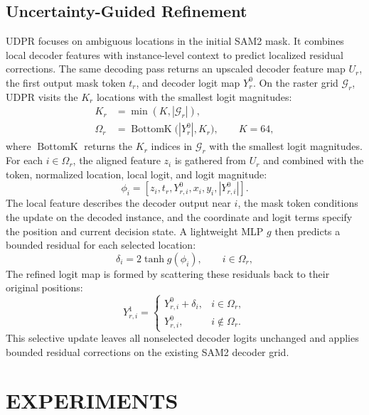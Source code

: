 \documentclass{article}
\begin{document}
\subsection{Uncertainty-Guided Refinement}
UDPR focuses on ambiguous locations in the initial SAM2 mask. It combines local decoder
features with instance-level context to predict localized residual corrections.
The same decoding pass returns an upscaled decoder feature map $U_r$, the
first output mask token $t_r$, and decoder logit map $Y_r^0$.
On the raster grid $\mathcal{G}_r$, UDPR visits the $K_r$ locations with
the smallest logit magnitudes:
\begin{equation}
\begin{aligned}
K_r&=\min(K,|\mathcal{G}_r|),\\
\Omega_r&=\operatorname{BottomK}\bigl(|Y_r^0|,K_r\bigr),\qquad K=64,
\end{aligned}
\label{eq:udpr-selection}
\end{equation}
\indent where $\operatorname{BottomK}$ returns the $K_r$ indices in $\mathcal{G}_r$
with the smallest logit magnitudes.
\indent For each $i\in\Omega_r$, the aligned feature $z_i$ is gathered from $U_r$ and
combined with the token, normalized location, local logit, and logit magnitude:
\begin{equation}
\phi_i=[z_i,t_r,Y^0_{r,i},x_i,y_i,|Y^0_{r,i}|].
\label{eq:udpr-input}
\end{equation}
\indent The local feature describes the decoder output near $i$, the mask token
conditions the update on the decoded instance, and the coordinate and logit
terms specify the position and current decision state. A lightweight MLP $g$
then predicts a bounded residual for each selected location:
\begin{equation}
\delta_i=2\tanh g(\phi_i),\qquad i\in\Omega_r,
\label{eq:udpr}
\end{equation}
\indent The refined logit map is formed by scattering these residuals back to their
original positions:
\begin{equation}
Y^1_{r,i}=\begin{cases}
Y^0_{r,i}+\delta_i, & i\in\Omega_r,\\
Y^0_{r,i}, & i\notin\Omega_r.
\end{cases}
\label{eq:udpr-scatter}
\end{equation}
\indent This selective update leaves all nonselected decoder logits unchanged and
applies bounded residual corrections on the existing SAM2 decoder grid.

\section{EXPERIMENTS}
\end{document}

